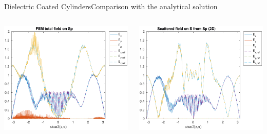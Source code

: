 \begin{frame}[allowframebreaks]{Dielectric Coated Cylinders}{Comparison with the analytical solution }
    \begin{columns}
      \includegraphics[width=\linewidth]{results/TEc15/E_Sp.pdf}

      \includegraphics[width=\linewidth]{results/TEc15/E_S.pdf}
      

\end{columns}
\end{frame}
